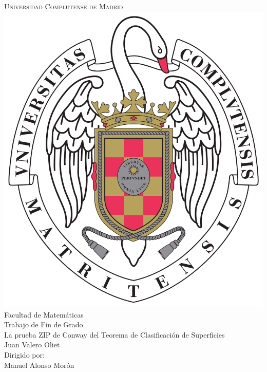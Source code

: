 \documentclass[10pt]{report}
\theoremstyle{definition}
\newcommand\blankpage{%
    \null
    \thispagestyle{empty}%
    \newpage}
\begin{document}
\afterpage{\blankpage}
\begin{titlepage} %
\begin{center} %

\huge\textsc{Universidad Complutense de Madrid}\\[0.2in]
\includegraphics[scale=0.14]{complu}\\[0.1in] %

\Large{Facultad de Matemáticas}\\[0.5in] %
\Large{Trabajo de Fin de Grado}\\[.1in]
\Huge {La prueba ZIP de Conway del Teorema de Clasificación de Superficies}\\[0.2in]



\vfill %
\Large {Juan Valero Oliet}\\[0.5in]
\vfill 
Dirigido por:\\
Manuel Alonso Morón\\[.1in]
\Large{}%
\end{center}

\end{titlepage}
\end{document}
